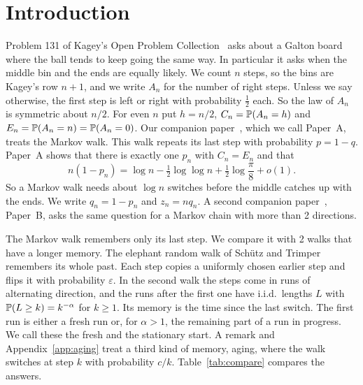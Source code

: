 \section{Introduction}\label{sec:intro}

Problem 131 of Kagey's Open Problem Collection~\cite{kagey131} asks about a
Galton board where the ball tends to keep going the same way. In particular
it asks when the middle bin and the ends are equally likely. We count $n$
steps, so the bins are Kagey's row $n+1$, and we write $A_n$ for the number
of right steps. Unless we say otherwise, the first step is left or right
with probability $\frac12$ each. So the law of $A_n$ is symmetric about
$n/2$. For even $n$ put $h=n/2$, $C_n=\mathbb{P}(A_n=h)$ and
$E_n=\mathbb{P}(A_n=n)=\mathbb{P}(A_n=0)$.
Our companion paper~\cite{paperA}, which we call Paper~A, treats the Markov
walk. This walk repeats its last step with probability $p=1-q$. Paper~A
shows that there is exactly one $p_n$ with $C_n=E_n$ and that
\[
 n(1-p_n)=\log n-\tfrac12\log\log n+\tfrac12\log\frac{\pi}{8}+o(1).
\]
So a Markov walk needs about $\log n$ switches before the middle catches up
with the ends. We write $q_n=1-p_n$ and $z_n=nq_n$. A second companion
paper~\cite{paperB}, Paper~B, asks the same question for a Markov chain with
more than 2 directions.

The Markov walk remembers only its last step. We compare it with 2 walks
that have a longer memory. The elephant random walk of Sch\"utz and
Trimper~\cite{schutz2004} remembers its whole past. Each step copies a
uniformly chosen earlier step and flips it with probability $\varepsilon$.
In the second walk the steps come in runs of alternating direction, and the
runs after the first one have i.i.d.\ lengths $L$ with
$\mathbb{P}(L\ge k)=k^{-\alpha}$ for $k\ge1$. Its memory is the time since the
last switch. The first run is either a fresh run or, for $\alpha>1$, the
remaining part of a run in progress. We call these the fresh and the
stationary start. A remark and Appendix~\ref{app:aging} treat a third kind
of memory, aging, where the walk switches at step $k$ with probability
$c/k$.
Table~\ref{tab:compare} compares the answers.

